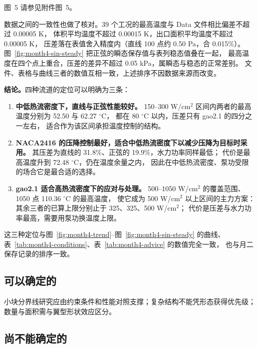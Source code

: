 \documentclass[stage2,fontset=fandol]{ydzjreport}
\makeatletter
\newcommand{\submissionnumber}[1]{\def\@currentlabel{#1}}
\makeatother
\begin{document}
\par\noindent \begingroup\submissionnumber{5}\label{fig:month4-sin-steady}\endgroup 图~5 请参见附件图~5。\par


数据之间的一致性也做了核对。39 个工况的最高温度与 Data 文件相比偏差不超过 0.00005 K，
体积平均温度不超过 0.00015 K，出口面积平均温度不超过 0.00005 K，
压差落在表值舍入精度内（直线 100 点约 0.50 Pa，合 0.015\%）。
图~\ref{fig:month4-sin-steady} 把正弦的瞬态保存值与表列稳态值叠在一起，
最高温度在四个点上重合，压差的差异不超过 0.05 kPa，属瞬态与稳态的正常差别。
文件、表格与曲线三者的数值互相一致，上述排序不因数据来源而改变。

\textbf{结论。}四种流道的定位可以明确为三条：

\begin{enumerate}
	\item \textbf{中低热流密度下，直线与正弦性能较好。}
	150--300 W/cm$^2$ 区间内两者的最高温度分别为 52.50 与 62.27 $^\circ$C，
	都在 80 $^\circ$C 以内，压差只有 gao2.1 的四分之一左右，
	适合作为该区间承担温度控制的结构。
	\item \textbf{NACA2416 的压降控制最好，适合中低热流密度下以减少压降为目标时采用。}
	其压差为直线的 31.8\%、正弦的 19.9\%，水力功率同样最低；
	代价是最高温度升到 72.48 $^\circ$C，仍在温度余量之内，
	因此在中低热流密度、泵功受限的场合它是最合适的选择。
	\item \textbf{gao2.1 适合高热流密度下的应对与处理。}
	500--1050 W/cm$^2$ 的覆盖范围、1050 点 110.36 $^\circ$C 的最高温度，
	使它成为 500 W/cm$^2$ 以上区间的主力方案：其余三者的已算上限分别止于
	325、325、500 W/cm$^2$；
	代价是压差与水力功率最高，需要用泵功换温度上限。
\end{enumerate}

这三种定位与图~\ref{fig:month4-trend}--图~\ref{fig:month4-sin-steady} 的曲线、
表~\ref{tab:month4-conditions}、表~\ref{tab:month4-advice} 的数值完全一致，
也与月二保存记录的排序一致。

\subsection{可以确定的}

小块分界线研究应由约束条件和性能对照支撑；复杂结构不能凭形态获得优先级；数量与面积需与翼型形状效应区分。

\subsection{尚不能确定的}
\end{document}
